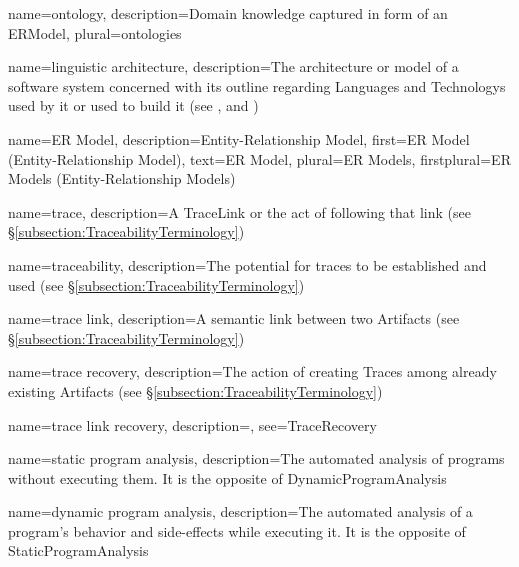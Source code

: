 {
    name={ontology},
    description={Domain knowledge captured in form of an \gls{ERModel}},
    plural={ontologies}
}


{
    name={linguistic architecture},
    description={The architecture or model of a software system concerned with its outline regarding \glspl{Language} and \glspl{Technology} used by it or used to build it (see  \cite{DBLP:conf/models/FavreLV12}, \cite{DBLP:conf/ecmdafa/LammelV14} and \cite{DBLP:conf/modelsward/HeinzLV17})}
}

{
    name={ER Model},
    description={Entity-Relationship Model},
    first={ER Model (Entity-Relationship Model)},
    text={ER Model},
    plural={ER Models},
    firstplural={ER Models (Entity-Relationship Models)}
}

{
    name={trace},
    description={A \gls{TraceLink} or the act of following that link \cite{DBLP:books/daglib/p/GotelCHZEGDAMM12} (see §\ref{subsection:TraceabilityTerminology})}
}

{
    name={traceability},
    description={The potential for traces to be established and used \cite{DBLP:books/daglib/p/GotelCHZEGDAMM12} (see §\ref{subsection:TraceabilityTerminology})}
}

{
    name={trace link},
    description={A semantic link between two \glspl{Artifact} \cite{DBLP:books/daglib/p/GotelCHZEGDAMM12} (see §\ref{subsection:TraceabilityTerminology})}
}

{
    name={trace recovery},
    description={The action of creating \glspl{Trace} among already existing \glspl{Artifact} \cite{DBLP:books/daglib/p/GotelCHZEGDAMM12} (see §\ref{subsection:TraceabilityTerminology})}
}

{
    name={trace link recovery},
    description={},
    see={TraceRecovery}
}

{
    name={static program analysis},
    description={The automated analysis of programs without executing them. It is the opposite of \gls{DynamicProgramAnalysis}}
}

{
    name={dynamic program analysis},
    description={The automated analysis of a program's behavior and side-effects while executing it. It is the opposite of \gls{StaticProgramAnalysis}}
}
